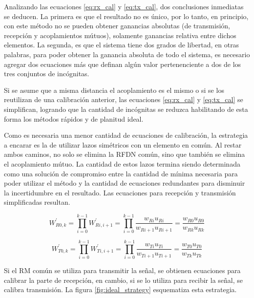 Analizando las ecuaciones \ref{eq:rx_cal} y \ref{eq:tx_cal}, dos conclusiones inmediatas se deducen. La primera es que el
resultado no es único, por lo tanto, en principio, con este método no se pueden obtener ganancias absolutas (de transmisión,
recepción y acoplamientos mútuos), solamente ganancias relativa entre dichos elementos. La segunda, es que el sistema tiene
dos grados de libertad, en otras palabras, para poder obtener la ganancia absoluta de todo el sistema, es necesario agregar
dos ecuaciones más que definan algún valor pertenenciente a dos de los tres conjuntos de incógnitas.

Si se asume que a misma distancia el acoplamiento es el mismo o si se los reutilizan de una calibración anterior, las
ecuaciones \ref{eq:rx_cal} y \ref{eq:tx_cal} se simplifican, logrando que la cantidad de incógnitas se reduzca habilitando
de esta forma los métodos rápidos y de planitud ideal. 

Como es necesaria una menor cantidad de ecuaciones de calibración, la estrategia a encarar es la de utilizar lazos simétricos
con un elemento en común. Al restar ambos caminos, no solo se elimina la RFDN común, sino que también se elimina el
acoplamiento mútuo. La cantidad de estos lazos termina siendo determinada como una solución de compromiso entre la cantidad de
mínima necesaria para poder utilizar el método y la cantidad de ecuaciones redundantes para disminuir la incertidumbre en el
resultado. Las ecuaciones para recepción y transmisión simplificadas resultan.

\begin{equation}
	W^{'}_{R0,k} = \prod_{i=0}^{k-1} W^{'}_{Ri,i+1} = \prod_{i=0}^{k-1}\dfrac{w_{Ri} u_{Ri}}{w_{Ri + 1} u_{Ri + 1}} =
	\dfrac{w_{R0} u_{R0}}{w_{Rk} u_{Rk}}
	\label{eq:rx_simp_cal}
\end{equation}

\begin{equation}
	W^{'}_{T0,k} = \prod_{i=0}^{k-1} W^{'}_{Ti,i+1} = \prod_{i=0}^{k-1}\dfrac{w_{Ti} u_{Ti}}{w_{Ti + 1} u_{Ti + 1}} =
	\dfrac{w_{T0} u_{T0}}{w_{Tk} u_{Tk}}
	\label{eq:tx_simp_cal}
\end{equation}

Si el RM común se utiliza para transmitir la señal, se obtienen ecuaciones para calibrar la parte de recepción, en cambio,
si se lo utiliza para recibir la señal, se calibra transmisión. La figura \ref{fig:ideal_strategy} esquematiza esta estrategia.

